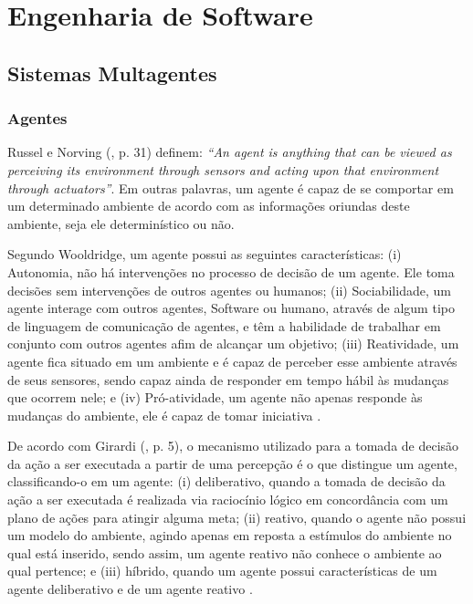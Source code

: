 \section{Engenharia de Software}
\subsection{Sistemas Multagentes}
\subsubsection{Agentes}

Russel e Norving (\citeyear{russel2003}, p. 31) definem: \textit{“An agent is anything that can be viewed as perceiving its environment through sensors and acting upon that environment through actuators”}. Em outras palavras, um agente é capaz de se comportar em um determinado ambiente de acordo com as informações oriundas deste ambiente, seja ele determinístico ou não.

Segundo Wooldridge, um agente possui as seguintes características: (i) Autonomia, não há intervenções no processo de decisão de um agente. Ele toma decisões sem intervenções de outros agentes ou humanos; (ii) Sociabilidade, um agente interage com outros agentes, Software ou humano, através de algum tipo de linguagem de comunicação de agentes, e têm a habilidade de trabalhar em conjunto com outros agentes afim de alcançar um objetivo; (iii) Reatividade, um agente fica situado em um ambiente e é capaz de perceber esse ambiente através de seus sensores, sendo capaz ainda de responder em tempo hábil às mudanças que ocorrem nele; e (iv) Pró-atividade, um agente não apenas responde às mudanças do ambiente, ele é capaz de tomar iniciativa \cite[p. 2-3]{wooldrige2002}.

De acordo com Girardi (\citeyear{girardi2004}, p. 5), o mecanismo utilizado para a tomada de decisão da ação a ser executada a partir de uma percepção é o que distingue um agente, classificando-o em um agente: (i) deliberativo, quando a tomada de decisão da ação a ser executada é realizada via raciocínio lógico em concordância com um plano de ações para atingir alguma meta; (ii) reativo, quando o agente não possui um modelo do ambiente, agindo apenas em reposta a estímulos do ambiente no qual está inserido, sendo assim, um agente reativo não conhece o ambiente ao qual pertence; e (iii) híbrido, quando um agente possui características de um agente deliberativo e de um agente reativo \cite[p. 5]{girardi2004}. 


